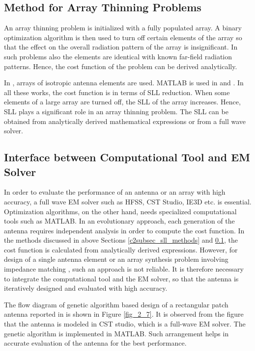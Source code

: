 \subsection{Method for Array Thinning Problems} \label{c2subsec_thinning}
An array thinning problem is initialized with a fully populated array. A binary optimization algorithm is then used to turn off certain elements of the array so that the effect on the overall radiation pattern of the array is insignificant. In such problems also the elements are identical with known far-field radiation patterns. Hence, the cost function of the problem can be derived analytically.

In \cite{arrayThin1, arrayThin2, arrayThin3}, arrays of isotropic antenna elements are used. MATLAB is used in \cite{arrayThin2} and \cite{arrayThin3}. In all these works, the cost function is in terms of SLL reduction. When some elements of a large array are turned off, the SLL of the array increases. Hence, SLL plays a significant role in an array thinning problem. The SLL can be obtained from analytically derived mathematical expressions or from a full wave solver.

\subsection{Interface between Computational Tool and EM Solver} \label{c2subsec_tools}
In order to evaluate the performance of an antenna or an array with high accuracy, a full wave EM solver such as HFSS, CST Studio, IE3D etc. is essential. Optimization algorithms, on the other hand, needs specialized computational tools such as MATLAB. In an evolutionary approach, each generation of the antenna requires independent analysis in order to compute the cost function. In the methods discussed in above Sections \ref{c2subsec_sll_methods} and \ref{c2subsec_thinning}, the cost function is calculated from analytically derived expressions. However, for design of a single antenna element \cite{patch_miniaturize_ga, optPatch, freqReconfCogn} or an array synthesis problem involving impedance matching \cite{arraySynth1}, such an approach is not reliable. It is therefore necessary to integrate the computational tool and the EM solver, so that the antenna is iteratively designed and evaluated with high accuracy.

The flow diagram of genetic algorithm based design of a rectangular patch antenna reported in \cite{patch_miniaturize_ga} is shown in Figure \ref{fig_2_7}. It is observed from the figure that the antenna is modeled in CST studio, which is a full-wave EM solver. The genetic algorithm is implemented in MATLAB. Such arrangement helps in accurate evaluation of the antenna for the best performance.

